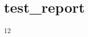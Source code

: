 \chapter{test\+\_\+report}
\hypertarget{md_documents_2test__report}{}\label{md_documents_2test__report}
12 